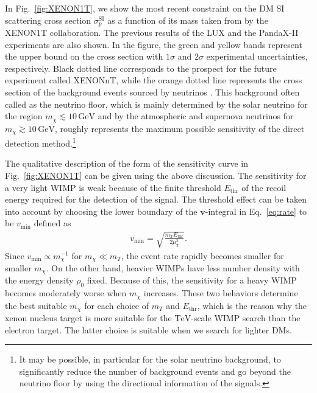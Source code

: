 \documentclass[12pt,twoside,book]{article}
\begin{document}
In Fig.~\ref{fig:XENON1T}, we show the most recent constraint on the DM SI scattering cross section $\sigma_p^{\mathrm{SI}}$ as a function of its mass taken from \cite{Aprile:2018dbl} by the XENON1T collaboration.
The previous results of the LUX \cite{Akerib:2016vxi} and the PandaX-II \cite{Cui:2017nnn} experiments are also shown.
In the figure, the green and yellow bands represent the upper bound on the cross section with $1\sigma$ and $2\sigma$ experimental uncertainties, respectively.
Black dotted line corresponds to the prospect for the future experiment called XENONnT, while the orange dotted line represents the cross section of the background events sourced by neutrinos \cite{Billard:2013qya}.
This background often called as the neutrino floor, which is mainly determined by the solar neutrino for the region $m_\chi \lesssim 10\,\mathrm{GeV}$ and by the atmospheric and supernova neutrinos for $m_\chi \gtrsim 10\,\mathrm{GeV}$, roughly represents the maximum possible sensitivity of the direct detection method.\footnote{
  It may be possible, in particular for the solar neutrino background, to significantly reduce the number of background events and go beyond the neutrino floor by using the directional information of the signals.
}

The qualitative description of the form of the sensitivity curve in Fig.~\ref{fig:XENON1T} can be given using the above discussion.
The sensitivity for a very light WIMP is weak because of the finite threshold $E_{\mathrm{thr}}$ of the recoil energy required for the detection of the signal.
The threshold effect can be taken into account by choosing the lower boundary of the $\bm{v}$-integral in Eq.~\eqref{eq:rate} to be $v_{\mathrm{min}}$ defined as
\begin{align}
  v_{\mathrm{min}} = \sqrt{\frac{m_T E_{\mathrm{thr}}}{2 \mu_T^2}}.
\end{align}
Since $v_{\mathrm{min}} \propto m_\chi^{-1}$ for $m_\chi \ll m_T$, the event rate rapidly becomes smaller for smaller $m_\chi$.
On the other hand, heavier WIMPs have less number density with the energy density $\rho_0$ fixed.
Because of this, the sensitivity for a heavy WIMP becomes moderately worse when $m_\chi$ increases.
These two behaviors determine the best suitable $m_\chi$ for each choice of $m_T$ and $E_{\mathrm{thr}}$, which is the reason why the xenon nucleus target is more suitable for the $\mathrm{TeV}$-scale WIMP search than the electron target.
The latter choice is suitable when we search for lighter DMs.
\end{document}
